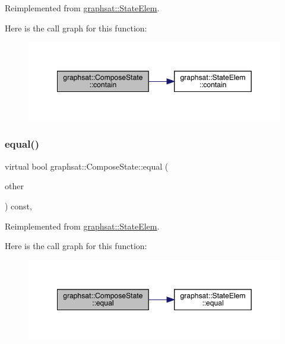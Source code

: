 Reimplemented from \mbox{\hyperlink{classgraphsat_1_1_state_elem_a9f05de6c6926420c7ba4a79f0fab956f}{graphsat\+::\+State\+Elem}}.

Here is the call graph for this function\+:\nopagebreak
\begin{figure}[H]
\begin{center}
\leavevmode
\includegraphics[width=349pt]{classgraphsat_1_1_compose_state_a10249606cb19be7ce9cf17f6fb2e5509_cgraph}
\end{center}
\end{figure}
\mbox{\label{classgraphsat_1_1_compose_state_a0163df015711607299462617d7132d2d}} 
\subsubsection{\texorpdfstring{equal()}{equal()}}
{\footnotesize\ttfamily virtual bool graphsat\+::\+Compose\+State\+::equal (\begin{DoxyParamCaption}\item[{const \mbox{\hyperlink{classgraphsat_1_1_state_elem}{State\+Elem}} $\ast$}]{other }\end{DoxyParamCaption}) const\hspace{0.3cm}{\ttfamily [inline]}, {\ttfamily [virtual]}}



Reimplemented from \mbox{\hyperlink{classgraphsat_1_1_state_elem_a96f98a1a836950bec46b03269defd823}{graphsat\+::\+State\+Elem}}.

Here is the call graph for this function\+:\nopagebreak
\begin{figure}[H]
\begin{center}
\leavevmode
\includegraphics[width=349pt]{classgraphsat_1_1_compose_state_a0163df015711607299462617d7132d2d_cgraph}
\end{center}
\end{figure}
\mbox{\label{classgraphsat_1_1_compose_state_ae1b74f6f1f3d18694e1a8f1d83bec163}} 
